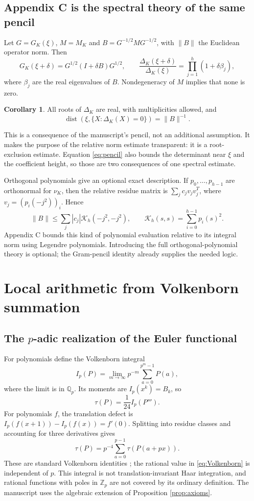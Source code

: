 \documentclass[11pt]{article}
\theoremstyle{definition}
\newtheorem{corollary}[proposition]{Corollary}
\theoremstyle{remark}\newtheorem*{remark}{Remark}
\newcommand{\Q}{\mathbb Q}
\newcommand{\Z}{\mathbb Z}
\begin{document}
\subsection{Appendix C is the spectral theory of the same pencil}
Let $G=G_K(\xi)$, $M=M_K$ and $B=G^{-1/2}MG^{-1/2}$, with $\|B\|$
the Euclidean operator norm. Then
\begin{equation}\label{eq:pencil}
 G_K(\xi+\delta)=G^{1/2}(I+\delta B)G^{1/2},\qquad
 \frac{\Delta_K(\xi+\delta)}{\Delta_K(\xi)}
     =\prod_{j=1}^h(1+\delta\beta_j),
\end{equation}
where $\beta_j$ are the real eigenvalues of $B$. Nondegeneracy of $M$ implies
that none is zero.
\begin{corollary}\label{cor:roots}
All roots of $\Delta_K$ are real, with multiplicities allowed, and
\[
 \operatorname{dist}(\xi,\{X:\Delta_K(X)=0\})=\|B\|^{-1}.
\]
\end{corollary}
This is a consequence of the manuscript's pencil, not an additional assumption.
It makes the purpose of the relative norm estimate transparent: it is a
root-exclusion estimate. Equation \eqref{eq:pencil} also bounds the determinant
near $\xi$ and the coefficient height, so those are two consequences of one
spectral estimate.

Orthogonal polynomials give an optional exact description. If $p_0,\ldots,p_{h-1}$
are orthonormal for $\nu_K$, then the relative residue matrix is
$\sum_j c_j v_jv_j^T$, where $v_j=(p_i(-j^2))_i$. Hence
\[
 \|B\|\le\sum_j|c_j|\mathcal K_h(-j^2,-j^2),\qquad
 \mathcal K_h(s,s)=\sum_{i=0}^{h-1}p_i(s)^2.
\]
Appendix C bounds this kind of polynomial evaluation relative to its integral
norm using Legendre polynomials. Introducing the full orthogonal-polynomial
theory is optional; the Gram-pencil identity already supplies the needed logic.

\section{Local arithmetic from Volkenborn summation}

\subsection{The \texorpdfstring{$p$}{p}-adic realization of the Euler functional}
For polynomials define the Volkenborn integral
\[
 I_p(P)=\lim_{m\to\infty}p^{-m}\sum_{a=0}^{p^m-1}P(a),
\]
where the limit is in $\Q_p$. Its moments are $I_p(x^k)=B_k$, so
\begin{equation}\label{eq:Volkenborn}
 \tau(P)=\frac1{24}I_p(P''').
\end{equation}
For polynomials $f$, the translation defect is
$I_p(f(x+1))-I_p(f(x))=f'(0)$.
Splitting into residue classes and accounting for three derivatives gives
\[
 \tau(P)=p^{-4}\sum_{a=0}^{p-1}\tau(P(a+px)).
\]
These are standard Volkenborn identities \cite{Volkenborn,HuKim}; the rational
value in \eqref{eq:Volkenborn} is independent of $p$.
This integral is not translation-invariant Haar integration, and rational
functions with poles in $\Z_p$ are not covered by its ordinary definition.
The manuscript uses the algebraic extension of Proposition \ref{prop:axioms}.
\end{document}
